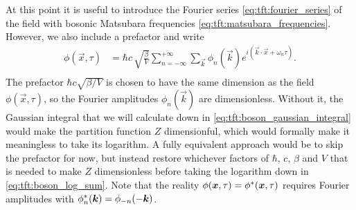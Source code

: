 At this point it is useful to introduce the Fourier series \eqref{eq:tft:fourier_series} of the field with bosonic Matsubara frequencies \eqref{eq:tft:matsubara_frequencies}.
However, we also include a prefactor and write
\begin{equation}
\begin{split}
	\phi(\vec{x}, \tau) & = \hbar c \, \sqrt{\frac{\beta}{V}} \sum_{n=-\infty}^{+\infty} \sum_{\vec{k}}      \phi_n(\vec{k})  e^{i (\vec{k} \cdot \vec{x} + \omega_n \tau)} . \\
\end{split}
\label{eq:tft:boson_fourier_series}
\end{equation}
The prefactor $\hbar c \sqrt{\beta/V}$ is chosen to have the same dimension as the field $\phi(\vec{x}, \tau)$, so the Fourier amplitudes $\phi_n(\vec{k})$ are dimensionless.
Without it, the Gaussian integral that we will calculate down in \cref{eq:tft:boson_gaussian_integral} would make the partition function $Z$ dimensionful, which would formally make it meaningless to take its logarithm.
A fully equivalent approach would be to skip the prefactor for now, but instead restore whichever factors of $\hbar$, $c$, $\beta$ and $V$ that is needed to make $Z$ dimensionless before taking the logarithm down in \cref{eq:tft:boson_log_sum}.
Note that the reality $\phi({\bm{x}}, \tau) = {\phi}^*({\bm{x}}, \tau)$ requires Fourier amplitudes with ${\phi}^*_n({\bm{k}}) = \phi_{-n}(-{\bm{k}})$.

